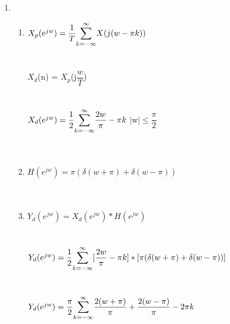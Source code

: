 \documentclass[10pt,a4paper, margin=1in]{article}
\begin{document}
\begin{enumerate}
\item 
    \begin{enumerate}
    \item %
        $ X_{p}(e^{jw}) = \dfrac{1}{T}  \mathlarger{\sum_{k=-\infty}}^{\infty}X(j(w-\pi k))$\\\\\\
        $X_{d}$(n) = $X_{p}$(j$\dfrac{w}{T}$)\\\\\\
        $ X_{d}(e^{jw}) = \dfrac{1}{2}  \mathlarger{\sum_{k=-\infty}^{\infty}} \dfrac {2w}{\pi}-\pi k$ \hspace{1cm} $|$w$| \leq \dfrac{\pi}{2}$ \\\\\\
         
   
        
    
    \item %
    
    
    $ H(e^{jw}) = \pi (\delta(w + \pi) + \delta(w - \pi)) $ \\\\\\
    
    \newpage
    \item %
    $ Y_{d}(e^{jw}) = X_{d}(e^{jw})*H(e^{jw})$\\\\\\
    $ Y_{d}(e^{jw}) = \dfrac{1}{2}  \mathlarger{\sum_{k=-\infty}^{\infty}} [\dfrac {2w}{\pi}-\pi k] * [\pi (\delta(w + \pi) + \delta(w - \pi))] $\\\\\\
    $ Y_{d}(e^{jw}) = \dfrac{\pi}{2}  \mathlarger{\sum_{k=-\infty}^{\infty}} \dfrac {2(w + \pi)}{\pi} + \dfrac {2(w - \pi)}{\pi} -2\pi k$
    

    \end{enumerate}



\end{enumerate}
\end{document}
